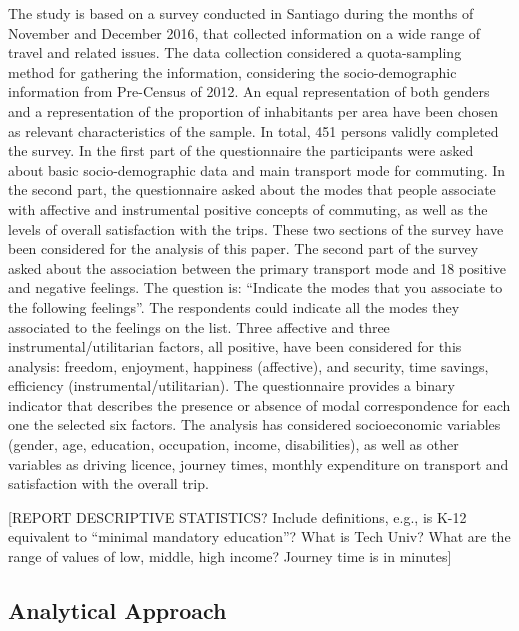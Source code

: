 \documentclass[]{elsarticle} %
\begin{document}
The study is based on a survey conducted in Santiago during the months
of November and December 2016, that collected information on a wide
range of travel and related issues. The data collection considered a
quota-sampling method for gathering the information, considering the
socio-demographic information from Pre-Census of 2012. An equal
representation of both genders and a representation of the proportion of
inhabitants per area have been chosen as relevant characteristics of the
sample. In total, 451 persons validly completed the survey. In the first
part of the questionnaire the participants were asked about basic
socio-demographic data and main transport mode for commuting. In the
second part, the questionnaire asked about the modes that people
associate with affective and instrumental positive concepts of
commuting, as well as the levels of overall satisfaction with the trips.
These two sections of the survey have been considered for the analysis
of this paper. The second part of the survey asked about the association
between the primary transport mode and 18 positive and negative
feelings. The question is: ``Indicate the modes that you associate to
the following feelings''. The respondents could indicate all the modes
they associated to the feelings on the list. Three affective and three
instrumental/utilitarian factors, all positive, have been considered for
this analysis: freedom, enjoyment, happiness (affective), and security,
time savings, efficiency (instrumental/utilitarian). The questionnaire
provides a binary indicator that describes the presence or absence of
modal correspondence for each one the selected six factors. The analysis
has considered socioeconomic variables (gender, age, education,
occupation, income, disabilities), as well as other variables as driving
licence, journey times, monthly expenditure on transport and
satisfaction with the overall trip.

{[}REPORT DESCRIPTIVE STATISTICS? Include definitions, e.g., is K-12
equivalent to ``minimal mandatory education''? What is Tech Univ? What
are the range of values of low, middle, high income? Journey time is in
minutes{]}

\hypertarget{analytical-approach}{%
\subsection{Analytical Approach}\label{analytical-approach}}
\end{document}
